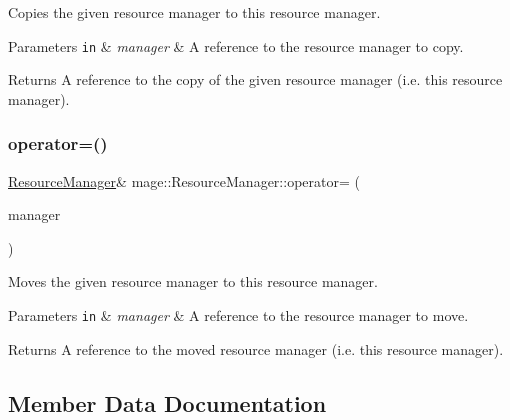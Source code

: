Copies the given resource manager to this resource manager.


\begin{DoxyParams}[1]{Parameters}
\mbox{\tt in}  & {\em manager} & A reference to the resource manager to copy. \\
\hline
\end{DoxyParams}
\begin{DoxyReturn}{Returns}
A reference to the copy of the given resource manager (i.\+e. this resource manager). 
\end{DoxyReturn}
\hypertarget{classmage_1_1_resource_manager_ac301d52cd5d6418013458f8090e19c88}{}\label{classmage_1_1_resource_manager_ac301d52cd5d6418013458f8090e19c88} 
\subsubsection{\texorpdfstring{operator=()}{operator=()}\hspace{0.1cm}{\footnotesize\ttfamily [2/2]}}
{\footnotesize\ttfamily \hyperlink{classmage_1_1_resource_manager}{Resource\+Manager}\& mage\+::\+Resource\+Manager\+::operator= (\begin{DoxyParamCaption}\item[{\hyperlink{classmage_1_1_resource_manager}{Resource\+Manager} \&\&}]{manager }\end{DoxyParamCaption})\hspace{0.3cm}{\ttfamily [delete]}}

Moves the given resource manager to this resource manager.


\begin{DoxyParams}[1]{Parameters}
\mbox{\tt in}  & {\em manager} & A reference to the resource manager to move. \\
\hline
\end{DoxyParams}
\begin{DoxyReturn}{Returns}
A reference to the moved resource manager (i.\+e. this resource manager). 
\end{DoxyReturn}


\subsection{Member Data Documentation}
\hypertarget{classmage_1_1_resource_manager_a9814578b0ce98e74f95e825caf554c59}{}\label{classmage_1_1_resource_manager_a9814578b0ce98e74f95e825caf554c59} 
